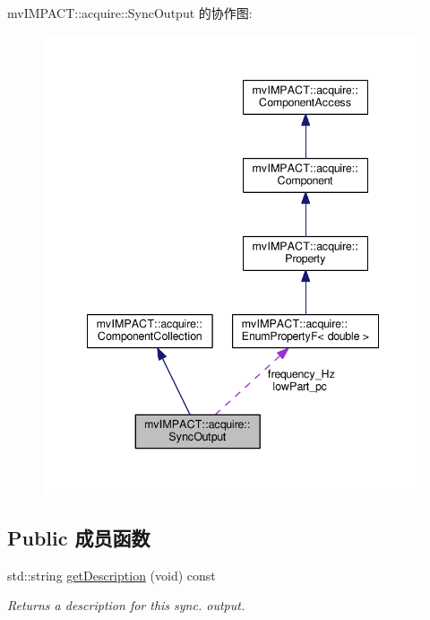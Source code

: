mv\+I\+M\+P\+A\+C\+T\+:\+:acquire\+:\+:Sync\+Output 的协作图\+:
\nopagebreak
\begin{figure}[H]
\begin{center}
\leavevmode
\includegraphics[width=341pt]{classmv_i_m_p_a_c_t_1_1acquire_1_1_sync_output__coll__graph}
\end{center}
\end{figure}
\subsection*{Public 成员函数}
\begin{DoxyCompactItemize}
\item 
std\+::string \hyperlink{classmv_i_m_p_a_c_t_1_1acquire_1_1_sync_output_a62221bcc005c6ca966d8d57e9d74e9e7}{get\+Description} (void) const 
\begin{DoxyCompactList}\small\item\em Returns a description for this sync. output. \end{DoxyCompactList}\end{DoxyCompactItemize}
